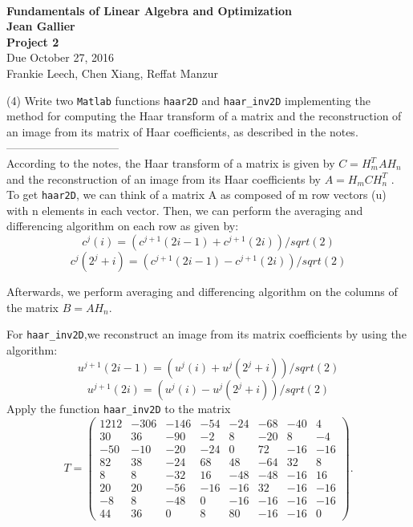 \documentclass[12pt]{article}
\begin{document}
\begin{center}
\\
\vspace{1cm}
{\Large\bf Fundamentals of Linear Algebra and Optimization\\
Jean Gallier \\
\vspace{0.5cm}
Project 2}\\[10pt]
Due October 27, 2016\\
Frankie Leech, Chen Xiang, Reffat Manzur\\
\end{center}

\vspace{0.5cm}

\medskip
(4)
Write two {\tt Matlab} functions {\tt haar2D} and {\tt haar\_inv2D}
implementing the method for computing the Haar transform
of a  matrix and the reconstruction of an image from its matrix of Haar
coefficients, as described in the notes.\\------------------------------\\
According to the notes, the Haar transform of a matrix is given by $C = H_m^T A H_n$ and the reconstruction of an image from its Haar coefficients by $A = H_m C H_n^T$ . To get {\tt haar2D}, we can think of a matrix A as    composed of m row vectors (u) with n elements in each vector. Then, we can perform the averaging and differencing algorithm on each row as given by:
$$c^j(i) = (c^{j+1}(2i -1) + c^{j+1}(2i))/sqrt(2)$$  
$$c^j(2^j+i) = (c^{j+1}(2i -1) - c^{j+1}(2i))/sqrt(2)$$ 

Afterwards, we perform averaging and differencing algorithm on the columns of the matrix $B=A H_n$.


For {\tt haar\_inv2D},we reconstruct an image from its matrix coefficients by using the algorithm: 
$$u^{j+1}(2i-1) = (u^{j}(i) + u^{j}(2^j+i))/sqrt(2)$$  
$$u^{j+1}(2i) = (u^{j}(i) - u^{j}(2^j+i))/sqrt(2)$$
\medskip
Apply the function {\tt haar\_inv2D} to the matrix
\[
T = 
\begin{pmatrix}
1212 & -306 & -146 & -54 & -24 & -68 & -40 & 4 \\
    30 & 36 & -90 & -2 &  8 & -20 & 8  & -4 \\
    -50 & -10 & -20 & -24 & 0 & 72 & -16 & -16 \\
    82 & 38 & -24 & 68 & 48 & -64 & 32 & 8 \\
    8 & 8 & -32 & 16 & -48 & -48 & -16 & 16 \\
    20 & 20 & -56 & -16 & -16 & 32 & -16 & -16 \\
    -8 & 8 & -48 & 0 & -16 & -16 & -16 &  -16 \\
    44 & 36 & 0 & 8 & 80 & -16 & -16 & 0
\end{pmatrix}.
\]
\end{document}

